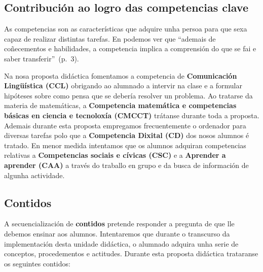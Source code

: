 \subsection{Contribución ao logro das competencias clave}\label{sec-comp}
As competencias son as características que adquire unha persoa para que sexa capaz de realizar distintas tarefas. En  podemos ver que ``ademais de coñecementos e habilidades, a competencia implica a comprensión do que se fai e saber transferir''~(p.~3).

Na nosa proposta didáctica fomentamos a competencia de \textbf{Comunicación Lingüística (CCL)} obrigando ao alumnado a intervir na clase e a formular hipóteses sobre como pensa que se debería resolver un problema. Ao tratarse da materia de matemáticas, a \textbf{Competencia matemática e competencias básicas en ciencia e tecnoloxía (CMCCT)} trátanse durante toda a proposta. Ademais durante esta proposta empregamos frecuentemente o ordenador para diversas tarefas polo que a \textbf{Competencia Dixital (CD)} dos nosos alumnos é tratado. En menor medida intentamos que os alumnos adquiran competencias relativas a \textbf{Competencias sociais e cívicas (CSC)} e a \textbf{Aprender a aprender (CAA)} a través do traballo en grupo e da busca de información de algunha actividade.


\subsection{Contidos}\label{sec:contidos}
A secuencialización de \textbf{contidos} pretende responder a pregunta de que lle debemos ensinar aos alumnos. Intentaremos que durante o transcurso da implementación desta unidade didáctica, o alumnado adquira unha serie de conceptos, procedementos e actitudes. Durante esta proposta didáctica trataranse os seguintes contidos:

